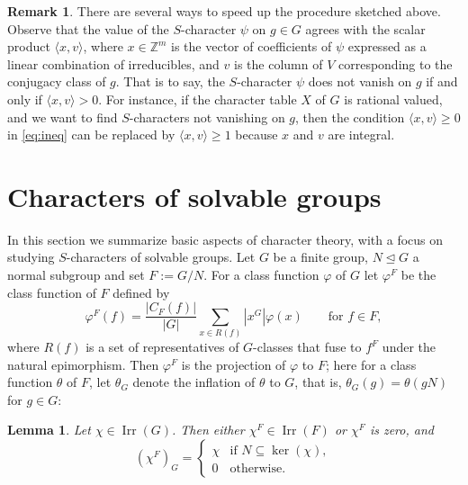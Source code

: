 \documentclass[12pt,leqno,a4paper]{amsart}
\newcommand{\ZZ}{{\mathbb{Z}}}
\newcommand{\Irr}{{\operatorname{Irr}}}
\let\vhi=\varphi
\newtheorem{lem}[thm]{Lemma}
\theoremstyle{definition}
\newtheorem{rem}[thm]{Remark}
\begin{document}
\begin{rem}\label{rem:speedup}
  There are several ways to speed up the procedure sketched above.
  Observe that the value of the $S$-character $\psi$ on $g\in G$ agrees with the scalar product $\langle x, v\rangle$, where $x\in\ZZ^m$ is the vector of coefficients of $\psi$ expressed as a linear combination of irreducibles, and $v$ is the column of $V$ corresponding to the conjugacy class of $g$.
  That is to say, the $S$-character $\psi$ does not vanish on $g$ if and only if $\langle x,v\rangle>0$.
  For instance, if the character table $X$ of $G$ is rational valued, and we want to find $S$-characters not vanishing on $g$, then the condition $\langle x,v\rangle\geq 0$ in \eqref{eq:ineq} can be replaced by $\langle x,v\rangle\geq 1$ because $x$ and $v$ are integral.
\end{rem}


\section{Characters of solvable groups}   \label{sec:solv}

In this section we summarize basic aspects of character theory, with a focus on
studying $S$-characters of solvable groups. Let $G$ be a finite group,
$N\unlhd G$ a normal subgroup and set $F:= G/N$. For a class function
$\vhi$ of $G$ let $\vhi^F$ be the class function of $F$ defined by
\[
   \vhi^F(f) = \frac{|C_F(f)|}{|G|} \sum_{x \in R(f)} |x^G| \vhi(x)\qquad
   \text{for $f\in F$},
\]
where $R(f)$ is a set of representatives of $G$-classes that fuse to $f^F$
under the natural epimorphism. Then $\vhi^F$ is the projection of $\vhi$ to $F$;
here for a class function $\theta$ of $F$, let $\theta_G$ denote the inflation
of $\theta$ to $G$, that is, $\theta_G(g) = \theta(gN)$ for $g \in G$:

\begin{lem}   \label{lem:proj}
 Let $\chi\in\Irr(G)$. Then either $\chi^F\in \Irr(F)$ or $\chi^F$ is zero, and
 $$(\chi^F)_G=\begin{cases} \chi& \text{if $N\subseteq \ker(\chi)$},\\
  0& \text{otherwise}.\end{cases}$$
\end{lem}
\end{document}
